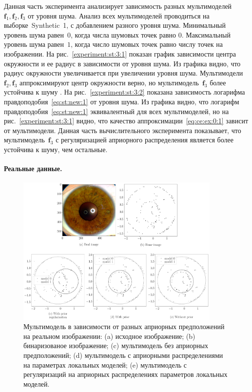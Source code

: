Данная часть эксперимента анализирует зависимость разных мультимоделей~$\textbf{f}_1, \textbf{f}_2, \textbf{f}_3$ от уровня шума. 
Анализ всех мультимоделей проводиться на выборке~Synthetic~1, с добавлением разного уровня шума.
Минимальный уровень шума равен~$0$, когда числа шумовых точек равно $0$. Максимальный уровень шума равен~$1$, когда число шумовых точек равно числу точек на изображении.
На рис.~\ref{experiment:st:3:1} показан график зависимости центра окружности и ее радиус в зависимости от уровня шума. Из графика видно, что радиус окружности увеличивается при увеличении уровня шума. 
Мультимодели~$\textbf{f}_2, \textbf{f}_3$ аппроксимируют центр окружности верно, но мультимодель~$\textbf{f}_3$ более устойчива к шуму .
На рис.~\ref{experiment:st:3:2} показана зависимость логарифма правдоподобия~\eqref{eq:st:new:1} от уровня шума. 
Из графика видно, что логарифм правдоподобия~\eqref{eq:st:new:1} эквивалентный для всех мультимоделей, но на рис.~\ref{experiment:st:3:1} видно, что качество аппроксимации~\eqref{eq:ce:ex:0:1} зависит от мультимодели.
Данная часть вычислительного эксперимента показывает, что мультимодель~$\textbf{f}_3$ с регуляризацией априорного распределения является более устойчива к шуму, чем остальные.

\paragraph{Реальные данные.}
\begin{figure}[h!t]\center
\includegraphics[width=0.9\textwidth]{results/priorexpert/experiment_real_compare}
\caption{Мультимодель в зависимости от разных априорных предположений на реальном изображении: (a) исходное изображение; (b) бинаризованое изображение; (c) мультимодель без априорных предположений; (d) мультимодель с априорными распределениями на параметрах локальных моделей; (e) мультимодель с регуляризаций на априорных распределениях параметров локальных моделей.}
\label{experiment:2}
\end{figure}

